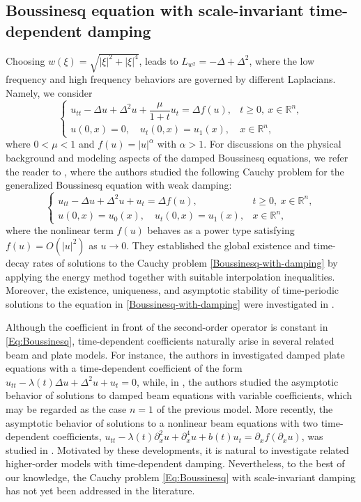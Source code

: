 \documentclass[10pt]{article}
\newcommand{\<}{\langle}
\renewcommand{\>}{\rangle}
\numberwithin{equation}{section}
\begin{document}
\subsection{Boussinesq equation with scale-invariant time-dependent damping} \label{Sect:BQ}
Choosing $w(\xi) = \sqrt{|\xi|^{2} + |\xi|^{4}}$, leads to $L_{w^2} = -\Delta + \Delta^2$, where the low frequency and high frequency behaviors are governed by different Laplacians. Namely, we consider
\begin{equation}\label{Eq:Boussinesq}
\begin{cases}
u_{tt} - \Delta u + \Delta^2 u + \dfrac{\mu}{1+t} u_t = \Delta f(u) , & t\geq0, \ x\in \mathbb{R}^n,  \\
u(0,x)=0, \quad u_t(0,x)=u_1(x), & x\in \mathbb{R}^n,
\end{cases}
\end{equation}
where $0<\mu<1$ and $f(u)=|u|^\alpha$ with $\alpha>1$. For discussions on the physical background and modeling aspects of the damped Boussinesq equations, we refer the reader to \cite{Wang-Luo-Li=2023}, where the authors studied the following Cauchy problem for the generalized Boussinesq equation with weak damping:
\begin{equation}\label{Boussinesq-with-damping}
\begin{cases}
u_{tt}-\Delta u+\Delta^2 u + u_t = \Delta f(u) , & t\geq0, \ x\in \mathbb{R}^n,  \\
u(0,x)=u_0(x), \quad u_t(0,x)=u_1(x), & x\in \mathbb{R}^n,
\end{cases}
\end{equation}
where the nonlinear term $f(u)$ behaves as a power type satisfying $f(u)=O(|u|^2)$ as $u\to 0$. They established the global existence and time-decay rates of solutions to the Cauchy problem \eqref{Boussinesq-with-damping} by applying the energy method together with suitable interpolation inequalities. Moreover, the existence, uniqueness, and asymptotic stability of time-periodic solutions to the equation in \eqref{Boussinesq-with-damping} were investigated in \cite{Wang-Li=2018}.

Although the coefficient in front of the second-order operator is constant in \eqref{Eq:Boussinesq}, time-dependent coefficients naturally arise in several related beam and plate models. For instance, the authors in \cite{DAE-ASY=2021} investigated damped plate equations with a time-dependent coefficient of the form $u_{tt}-\lambda(t)\Delta u+\Delta^2 u + u_t =0$, while, in \cite{Yoshikawa-Wakasugi=2018}, the authors studied the asymptotic behavior of solutions to damped beam equations with variable coefficients, which may be regarded as the case $n=1$ of the previous model. More recently, the asymptotic behavior of solutions to a nonlinear beam equations with two time-dependent coefficients, $u_{tt}-\lambda(t)\partial_x^2 u+\partial_x^4 u + b(t) u_t =\partial_x f(\partial_x u)$, was studied  in \cite{HWY=2024}. Motivated by these developments, it is natural to investigate related higher-order models with time-dependent damping. Nevertheless, to the best of our knowledge, the Cauchy problem \eqref{Eq:Boussinesq} with scale-invariant damping has not yet been addressed in the literature.
\end{document}
